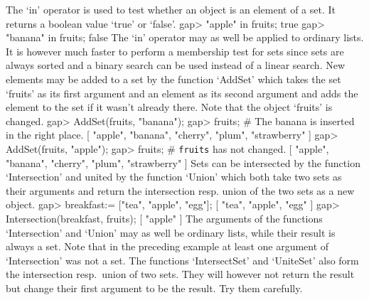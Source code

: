 The `in' operator is  used  to test whether an  object is an element of a
set.  It returns a boolean value `true' or `false'.
\beginexample
    gap> "apple" in fruits;
    true
    gap> "banana" in fruits;
    false 
\endexample
The `in' operator may as well be applied to ordinary lists. It is however
much faster to perform  a membership test for sets  since sets are always
sorted and a binary  search can be used instead  of a linear search.  New
elements may be added to a  set by the function  `AddSet' which takes the
set `fruits' as its first argument and an  element as its second argument
and adds the element to the set if it wasn't already there. Note that the
object `fruits' is changed.
\beginexample
    gap> AddSet(fruits, "banana");
    gap> fruits;  #  The banana is inserted in the right place.
    [ "apple", "banana", "cherry", "plum", "strawberry" ]
    gap> AddSet(fruits, "apple");
    gap> fruits;  #  {\tt fruits} has not changed.
    [ "apple", "banana", "cherry", "plum", "strawberry" ] 
\endexample
Sets can be intersected by the function `Intersection'  and united by the
function `Union' which both take  two sets as their arguments  and return
the intersection resp. union of the two sets as a new object.
\beginexample
    gap> breakfast:= ["tea", "apple", "egg"];
    [ "tea", "apple", "egg" ]
    gap> Intersection(breakfast, fruits);
    [ "apple" ] 
\endexample
The arguments of the functions `Intersection' and `Union'  may as well be
ordinary lists,  while  their result is  always  a set. Note that  in the
preceding example at least one argument of  `Intersection' was not a set.
The functions `IntersectSet'  and `UniteSet'  also form the  intersection
resp.~union  of  two sets. They  will  however not return  the result but
change their first argument to be the result. Try them carefully.


